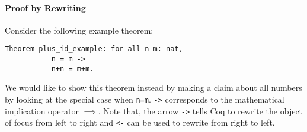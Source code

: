 	     \paragraph{Proof by Rewriting}
	     
	     Consider the following example theorem:     
		 \begin{lstlisting}[caption=\lstinline!plus_id_examples!]
		 Theorem plus_id_example: for all n m: nat,
	       n = m -> 
		   n+n = m+m.	 
		 \end{lstlisting}
		 We would like to show this theorem instead by making a claim about all numbers by looking at the special case when \lstinline!n=m!.
	     \lstinline!->! corresponds to the mathematical implication operator $\implies$. 
	     Note that, the arrow \lstinline!->! tells Coq to rewrite the object of focus from left to right and \lstinline!<-! can be used to rewrite from right to left.\\
	     
